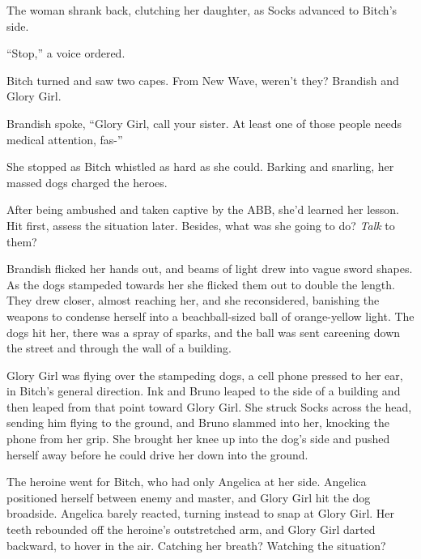 The woman shrank back, clutching her daughter, as Socks advanced to Bitch's side.



``Stop,'' a voice ordered.



Bitch turned and saw two capes.  From New Wave, weren't they?  Brandish and Glory Girl.



Brandish spoke, ``Glory Girl, call your sister.  At least one of those people needs medical attention, fas-''



She stopped as Bitch whistled as hard as she could.  Barking and snarling, her massed dogs charged the heroes.



After being ambushed and taken captive by the ABB, she'd learned her lesson.  Hit first, assess the situation later.  Besides, what was she going to do?  \emph{Talk} to them?



Brandish flicked her hands out, and beams of light drew into vague sword shapes.  As the dogs stampeded towards her she flicked them out to double the length.  They drew closer, almost reaching her, and she reconsidered, banishing the weapons to condense herself into a beachball-sized ball of orange-yellow light. The dogs hit her, there was a spray of sparks, and the ball was sent careening down the street and through the wall of a building.



Glory Girl was flying over the stampeding dogs, a cell phone pressed to her ear, in Bitch's general direction.  Ink and Bruno leaped to the side of a building and then leaped from that point toward Glory Girl.  She struck Socks across the head, sending him flying to the ground, and Bruno slammed into her, knocking the phone from her grip.  She brought her knee up into the dog's side and pushed herself away before he could drive her down into the ground.



The heroine went for Bitch, who had only Angelica at her side.  Angelica positioned herself between enemy and master, and Glory Girl hit the dog broadside.  Angelica barely reacted, turning instead to snap at Glory Girl.  Her teeth rebounded off the heroine's outstretched arm, and Glory Girl darted backward, to hover in the air.  Catching her breath?  Watching the situation?



